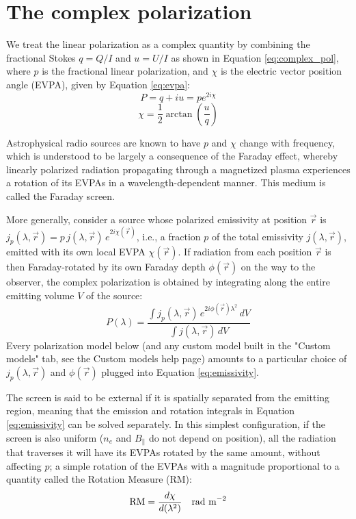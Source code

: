 \section{The complex polarization}
We treat the linear polarization as a complex quantity by combining the fractional Stokes $q=Q/I$ and $u=U/I$ as shown in Equation \ref{eq:complex_pol}, where $p$ is the fractional linear polarization, and $\chi$ is the electric vector position angle (EVPA), given by Equation \ref{eq:evpa}:
\begin{equation}\label{eq:complex_pol}
    P = q+iu = p e^{2i\chi}
\end{equation}
\begin{equation}\label{eq:evpa}
    \chi = \frac{1}{2}\arctan\left(\frac{u}{q}\right)
\end{equation}

Astrophysical radio sources are known to have $p$ and $\chi$ change with frequency, which is understood to be largely a consequence of the Faraday effect, whereby linearly polarized radiation propagating through a magnetized plasma experiences a rotation of its EVPAs in a wavelength-dependent manner. This medium is called the Faraday screen.

More generally, consider a source whose polarized emissivity at position $\vec r$ is $j_p(\lambda,\vec r) = p\,j(\lambda,\vec r)\,e^{2i\chi(\vec r)}$, i.e., a fraction $p$ of the total emissivity $j(\lambda,\vec r)$, emitted with its own local EVPA $\chi(\vec r)$. If radiation from each position $\vec r$ is then Faraday-rotated by its own Faraday depth $\phi(\vec r)$ on the way to the observer, the complex polarization is obtained by integrating along the entire emitting volume $V$ of the source:
\begin{equation}\label{eq:emissivity}
    \displaystyle P(\lambda) = \frac{\int j_p(\lambda,\vec r)\,e^{2i\phi(\vec r)\lambda^2}\,dV}{\int j(\lambda,\vec r)\,dV}
\end{equation}
Every polarization model below (and any custom model built in the "Custom models" tab, see the Custom models help page) amounts to a particular choice of $j_p(\lambda,\vec r)$ and $\phi(\vec r)$ plugged into Equation \ref{eq:emissivity}.

The screen is said to be external if it is spatially separated from the emitting region, meaning that the emission and rotation integrals in Equation \ref{eq:emissivity} can be solved separately. In this simplest configuration, if the screen is also uniform ($n_e$ and $B_\parallel$ do not depend on position), all the radiation that traverses it will have its EVPAs rotated by the same amount, without affecting $p$; a simple rotation of the EVPAs with a magnitude proportional to a quantity called the Rotation Measure (RM):
\begin{equation}\label{eq:RM}
    \text{RM} = \frac{d\chi}{d(\lambda^2)} \quad \textnormal{rad m}^{-2}
\end{equation}

